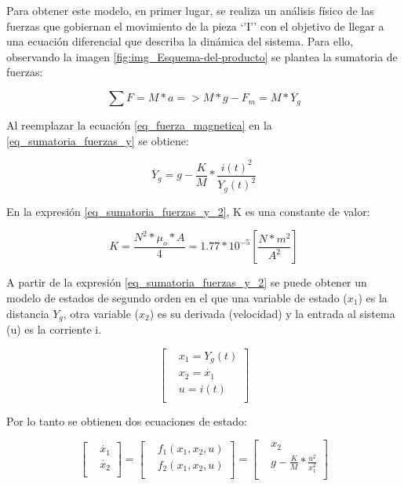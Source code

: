 Para obtener este modelo, en primer lugar, se realiza un análisis físico de las fuerzas que gobiernan el movimiento de la pieza ‘’I’’ con el objetivo de llegar a una ecuación diferencial que describa la dinámica del sistema. Para ello, observando la imagen \ref{fig:img_Esquema-del-producto} se plantea la sumatoria de fuerzas:

\begin{equation}\label{eq_sumatoria_fuerzas_y}
	\sum F=M*a=>M*g-F_{m}=M*\ddot{Y_g}
\end{equation}

\noindent Al reemplazar la ecuación \ref{eq_fuerza_magnetica} en la \ref{eq_sumatoria_fuerzas_y} se obtiene:

\begin{equation}\label{eq_sumatoria_fuerzas_y_2}
	\ddot{Y_g}=g-\frac{K}{M}*\frac{i(t)^{2}}{Y_g(t)^{2}}
\end{equation}

\noindent En la expresión \ref{eq_sumatoria_fuerzas_y_2}, K es una constante de valor:

\begin{equation}
	K=\frac{N^{2}*\mu_{o}*A}{4}=1.77*10^{-5} [\frac{N*m^2}{A^2}]
\end{equation}

A partir de la expresión \ref{eq_sumatoria_fuerzas_y_2} se puede obtener un modelo de estados de segundo orden en el que una variable de estado ($x_1$) es la distancia $Y_g$, otra variable ($x_2$) es su derivada (velocidad) y la entrada al sistema (u) es la corriente i. 


\begin{equation*}
	\begin{bmatrix} %
		&x_{1}=Y_g(t)\\
		&x_{2}=\dot{x_{1}}\\
		&u=i(t)\\
	\end{bmatrix}
\end{equation*}

\noindent Por lo tanto se obtienen dos ecuaciones de estado:

\begin{equation} \label{eq_modelo_estados}
	\begin{bmatrix} %
		&\dot{x_{1}}\\
		&\dot{x_{2}}\\
	\end{bmatrix}
	=
	\begin{bmatrix} %
		&f_1(x_1,x_2,u)\\
		&f_2(x_1,x_2,u)\\
	\end{bmatrix}
	=
	\begin{bmatrix} %
		&x_{2}\\
		&g-\frac{K}{M}*\frac{u^{2}}{x_{1}^{2}}\\
	\end{bmatrix}
\end{equation}

